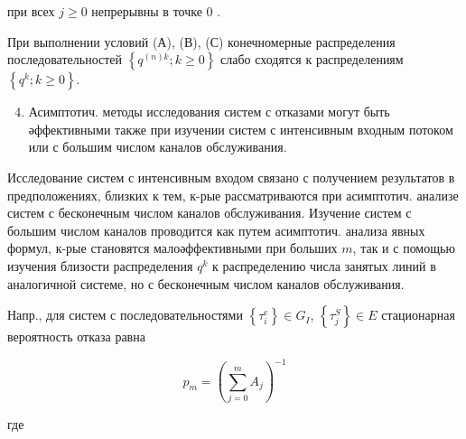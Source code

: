 \documentclass[10pt]{article}
\begin{document}
при всех $j \geqslant 0$ непрерывны в точке 0 .



При выполнении условий (А), (В), (С) конечномерные распределения последовательностей $\left\{q^{(n) k} ; k \geqslant 0\right\}$ слабо сходятся к распределениям $\left\{q^{k} ; k \geqslant 0\right\}$.



\begin{enumerate}

  \setcounter{enumi}{3}

  \item Асимптотич. методы исследования систем с отказами могут быть әффективными также при изучении систем с интенсивным входным потоком или с большим числом каналов обслуживания.

\end{enumerate}



Исследование систем с интенсивным входом связано с получением результатов в предположениях, близких к тем, к-рые рассматриваются при асимптотич. анализе систем с бесконечным числом каналов обслуживания. Изучение систем с большим числом каналов проводится как путем асимптотич. анализа явных формул, к-рые становятся малоәффективными при больших $m$, так и с помощью изучения близости распределения $q^{k}$ к распределению числа занятых линий в аналогичной системе, но с бесконечным числом каналов обслуживания.



Напр., для систем с последовательностями $\left\{\tau_{i}^{e}\right\} \in G_{I}$, $\left\{\tau_{j}^{S}\right\} \in E$ стационарная вероятность отказа равна



\[

p_{m}=\left(\sum_{j=0}^{m} A_{j}\right)^{-1}

\]



где
\end{document}
